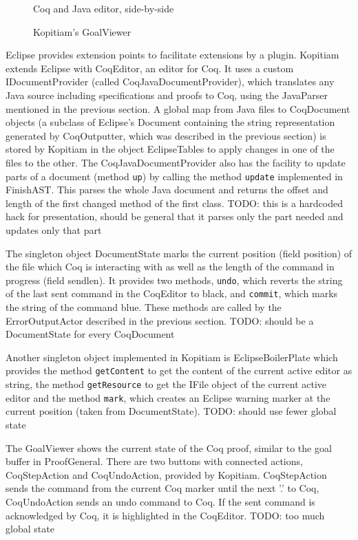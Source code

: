 \documentclass{article}
\begin{document}
\begin{figure}
\centering
{}
\caption{Coq and Java editor, side-by-side}
\label{fig:coqjava}
\end{figure}

\begin{figure}
\centering
{}
\caption{Kopitiam's GoalViewer}
\label{fig:goal}
\end{figure}


Eclipse provides extension points to facilitate extensions by a plugin. Kopitiam extends Eclipse with CoqEditor, an editor for Coq. It uses a custom IDocumentProvider (called CoqJavaDocumentProvider), which translates any Java source including specifications and proofs to Coq, using the JavaParser mentioned in the previous section. A global map from Java files to CoqDocument objects (a subclass of Eclipse's Document containing the string representation generated by CoqOutputter, which was described in the previous section) is stored by Kopitiam in the object EclipseTables to apply changes in one of the files to the other. The CoqJavaDocumentProvider also has the facility to update parts of a document (method \texttt{up}) by calling the method \texttt{update} implemented in FinishAST. This parses the whole Java document and returns the offset and length of the first changed method of the first class. TODO: this is a hardcoded hack for presentation, should be general that it parses only the part needed and updates only that part

The singleton object DocumentState marks the current position (field position) of the file which Coq is interacting with as well as the length of the command in progress (field sendlen). It provides two methods, \texttt{undo}, which reverts the string of the last sent command in the CoqEditor to black, and \texttt{commit}, which marks the string of the command blue. These methods are called by the ErrorOutputActor described in the previous section. TODO: should be a DocumentState for every CoqDocument

Another singleton object implemented in Kopitiam is EclipseBoilerPlate which provides the method \texttt{getContent} to get the content of the current active editor as string, the method \texttt{getResource} to get the IFile object of the current active editor and the method \texttt{mark}, which creates an Eclipse warning marker at the current position (taken from DocumentState). TODO: should use fewer global state

The GoalViewer shows the current state of the Coq proof, similar to the goal buffer in ProofGeneral. There are two buttons with connected actions, CoqStepAction and CoqUndoAction, provided by Kopitiam. CoqStepAction sends the command from the current Coq marker until the next '.' to Coq, CoqUndoAction sends an undo command to Coq. If the sent command is acknowledged by Coq, it is highlighted in the CoqEditor. TODO: too much global state
\end{document}
